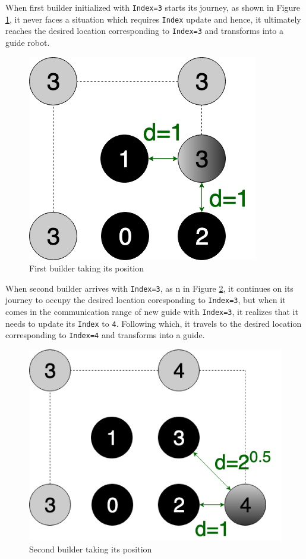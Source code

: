 \documentclass{report}[12pt]
\begin{document}
When first builder initialized with \texttt{Index=3} starts its journey, as shown in Figure \ref{fig:shape_formation_process_1}, it never faces a situation which requires \texttt{Index} update and hence, it ultimately reaches the desired location corresponding to \texttt{Index=3} and transforms into a guide robot. 
\begin{figure}[H]
	\centering
	\includegraphics[scale=0.4]{"images/shape_formation_process_1"}
	\caption{First builder taking its position}
	\label{fig:shape_formation_process_1}
\end{figure}
When second builder arrives with \texttt{Index=3}, as n in Figure \ref{fig:shape_formation_process_2}, it continues on its journey to occupy the desired location coresponding to \texttt{Index=3}, but when it comes in the communication range of new guide with \texttt{Index=3}, it realizes that it needs to update its \texttt{Index} to \texttt{4}. Following which, it travels to the desired location corresponding to \texttt{Index=4} and transforms into a guide.
\begin{figure}[H]
	\centering
	\includegraphics[scale=0.4]{"images/shape_formation_process_2"}
	\caption{Second builder taking its position}
	\label{fig:shape_formation_process_2}
\end{figure}
\end{document}

